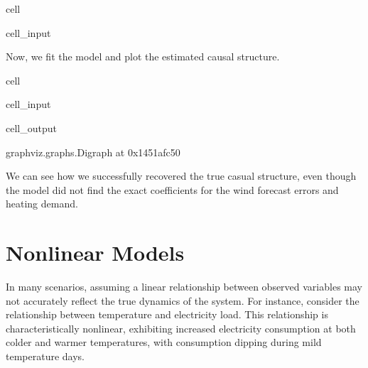 \documentclass[letterpaper,10pt,english]{jupyterBook}
\begin{document}
\begin{sphinxuseclass}{cell}
\begin{sphinxVerbatimInput}
\begin{sphinxuseclass}{cell_input}
\end{sphinxuseclass}\end{sphinxVerbatimInput}

\end{sphinxuseclass}
\sphinxAtStartPar
Now, we fit the  model and plot the estimated causal structure.

\begin{sphinxuseclass}{cell}\begin{sphinxVerbatimInput}

\begin{sphinxuseclass}{cell_input}
\begin{sphinxVerbatim}[commandchars=\\\{\}]
 

  
 
\end{sphinxVerbatim}

\end{sphinxuseclass}\end{sphinxVerbatimInput}
\begin{sphinxVerbatimOutput}

\begin{sphinxuseclass}{cell_output}
\begin{sphinxVerbatim}[commandchars=\\\{\}]
\PYGZlt{}graphviz.graphs.Digraph at 0x1451afc50\PYGZgt{}
\end{sphinxVerbatim}

\end{sphinxuseclass}\end{sphinxVerbatimOutput}

\end{sphinxuseclass}
\sphinxAtStartPar
We can see how we successfully recovered the true casual structure, even though the model did not find the exact coefficients for the wind forecast errors and heating demand.

\sphinxstepscope


\chapter{Nonlinear Models}
\label{\detokenize{notebooks/semiparametric_resit:nonlinear-models}}\label{\detokenize{notebooks/semiparametric_resit::doc}}
\sphinxAtStartPar
In many scenarios, assuming a linear relationship between observed variables may not accurately reflect the true dynamics of the system. For instance, consider the relationship between temperature and electricity load. This relationship is characteristically nonlinear, exhibiting increased electricity consumption at both colder and warmer temperatures, with consumption dipping during mild temperature days.
\end{document}

